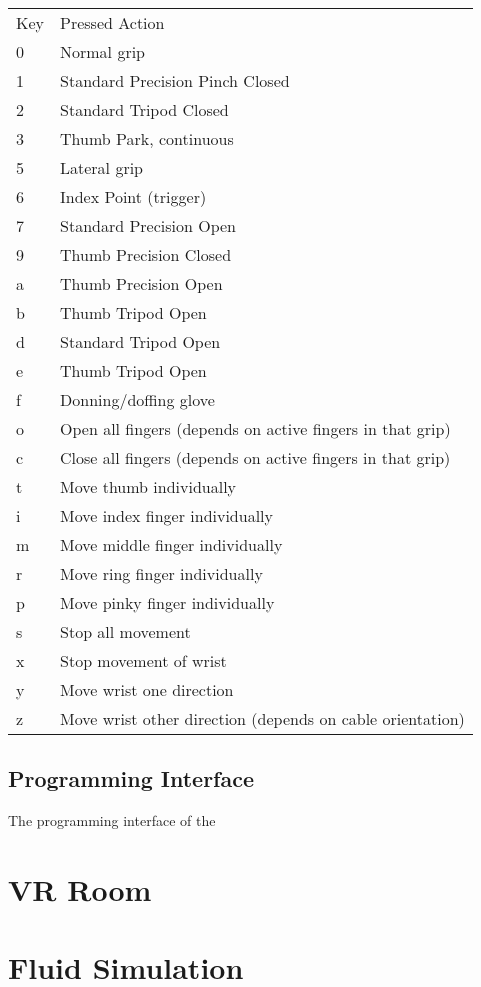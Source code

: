 \documentclass[11pt]{article}
\begin{document}
\begin{center}
\begin{tabular}{ll}
Key & Pressed Action\\
0 & Normal grip\\
1 & Standard Precision Pinch Closed\\
2 & Standard Tripod Closed\\
3 & Thumb Park, continuous\\
5 & Lateral grip\\
6 & Index Point (trigger)\\
7 & Standard Precision Open\\
9 & Thumb Precision Closed\\
a & Thumb Precision Open\\
b & Thumb Tripod Open\\
d & Standard Tripod Open\\
e & Thumb Tripod Open\\
f & Donning/doffing  glove\\
o & Open all fingers (depends on active fingers in that grip)\\
c & Close all fingers (depends on active fingers in that grip)\\
t & Move thumb individually\\
i & Move index finger individually\\
m & Move middle finger individually\\
r & Move ring finger individually\\
p & Move pinky finger individually\\
s & Stop all movement\\
x & Stop movement of wrist\\
y & Move wrist one direction\\
z & Move wrist other direction (depends on cable orientation)\\
\end{tabular}
\end{center}

\subsection{Programming Interface}
\label{sec:orgheadline3}
The programming interface of the


\section{VR Room}
\label{sec:orgheadline5}

\section{Fluid Simulation}
\label{sec:orgheadline6}
\end{document}
